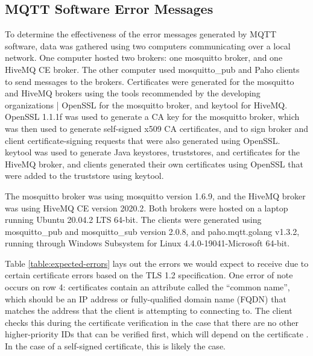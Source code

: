 \documentclass[12pt]{article}
\begin{document}
\subsection{MQTT Software Error Messages}
To determine the effectiveness of the error messages generated by MQTT software, data was gathered using two computers communicating over a local network. One computer hosted two brokers: one mosquitto broker, and one HiveMQ CE broker. The other computer used mosquitto\_pub and Paho clients to send messages to the brokers. Certificates were generated for the mosquitto and HiveMQ brokers using the tools recommended by the developing organizations | OpenSSL for the mosquitto broker, and keytool for HiveMQ. OpenSSL 1.1.1f was used to generate a CA key for the mosquitto broker, which was then used to generate self-signed x509 CA certificates, and to sign broker and client certificate-signing requests that were also generated using OpenSSL. keytool was used to generate Java keystores, truststores, and certificates for the HiveMQ broker, and clients generated their own certificates using OpenSSL that were added to the truststore using keytool.\par
The mosquitto broker was using mosquitto version 1.6.9, and the HiveMQ broker was using HiveMQ CE version 2020.2. Both brokers were hosted on a laptop running Ubuntu 20.04.2 LTS 64-bit. The clients were generated using mosquitto\_pub and mosquitto\_sub version 2.0.8, and paho.mqtt.golang v1.3.2, running through Windows Subsystem for Linux 4.4.0-19041-Microsoft 64-bit.\par
Table \ref{table:expected-errors} lays out the errors we would expect to receive due to certain certificate errors based on the TLS 1.2 specification. One error of note occurs on row 4: certificates contain an attribute called the ``common name'', which should be an IP address or fully-qualified domain name (FQDN) that matches the address that the client is attempting to connecting to. The client checks this during the certificate verification in the case that there are no other higher-priority IDs that can be verified first, which will depend on the certificate \cite{cn-resolution}. In the case of a self-signed certificate, this is likely the case.
\end{document}
